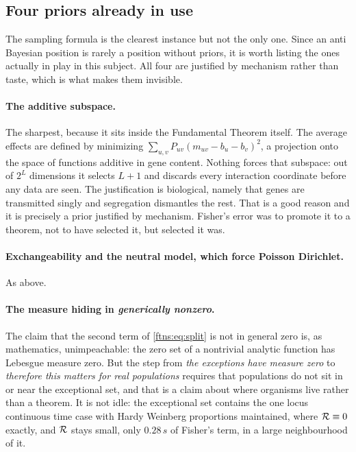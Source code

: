 \subsection{Four priors already in use}

The sampling formula is the clearest instance but not the only one. Since an anti Bayesian position
is rarely a position without priors, it is worth listing the ones actually in play in this subject.
All four are justified by mechanism rather than taste, which is what makes them invisible.

\paragraph{The additive subspace.} The sharpest, because it sits inside the Fundamental Theorem
itself. The average effects are defined by minimizing $\sum_{u,v}P_{uv}(m_{uv}-b_u-b_v)^2$, a
projection onto the space of functions additive in gene content. Nothing forces that subspace: out
of $2^L$ dimensions it selects $L+1$ and discards every interaction coordinate before any data
are seen. The justification is biological, namely that genes are transmitted singly and segregation
dismantles the rest. That is a good reason and it is precisely a prior justified by mechanism.
Fisher's error was to promote it to a theorem, not to have selected it, but selected it was.

\paragraph{Exchangeability and the neutral model, which force Poisson Dirichlet.} As above.

\paragraph{The measure hiding in \emph{generically nonzero}.} The claim that the second term of
\eqref{ftns:eq:split} is not in general zero is, as mathematics, unimpeachable: the zero set of a
nontrivial analytic function has Lebesgue measure zero. But the step from \emph{the exceptions have
measure zero} to \emph{therefore this matters for real populations} requires that populations do
not sit in or near the exceptional set, and that is a claim about where organisms live rather than
a theorem. It is not idle: the exceptional set contains the one locus continuous time case with
Hardy Weinberg proportions maintained, where $\mathcal{R}\equiv0$ exactly, and $\mathcal{R}$ stays small, only $0.28\,s$ of Fisher's term, in a large
neighbourhood of it.

